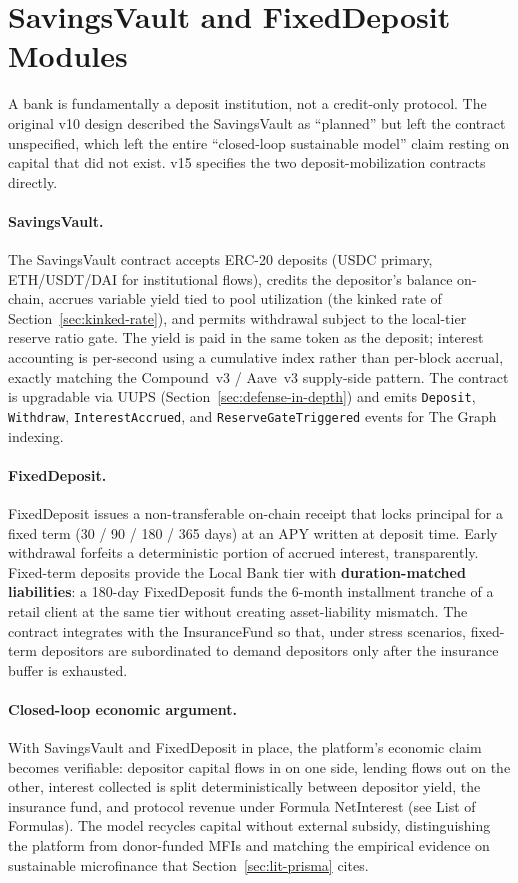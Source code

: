 \documentclass[12pt,a4paper]{report}
\begin{document}
\section{SavingsVault and FixedDeposit Modules}
\label{sec:savings-vault}

A bank is fundamentally a deposit institution, not a credit-only protocol. The original v10 design described the SavingsVault as ``planned'' but left the contract unspecified, which left the entire ``closed-loop sustainable model'' claim resting on capital that did not exist. v15 specifies the two deposit-mobilization contracts directly.

\paragraph{SavingsVault.}
The SavingsVault contract accepts ERC-20 deposits (USDC primary, ETH/USDT/DAI for institutional flows), credits the depositor's balance on-chain, accrues variable yield tied to pool utilization (the kinked rate of Section~\ref{sec:kinked-rate}), and permits withdrawal subject to the local-tier reserve ratio gate. The yield is paid in the same token as the deposit; interest accounting is per-second using a cumulative index rather than per-block accrual, exactly matching the Compound~v3 / Aave~v3 supply-side pattern. The contract is upgradable via UUPS (Section~\ref{sec:defense-in-depth}) and emits \texttt{Deposit}, \texttt{Withdraw}, \texttt{InterestAccrued}, and \texttt{ReserveGateTriggered} events for The Graph indexing.

\paragraph{FixedDeposit.}
FixedDeposit issues a non-transferable on-chain receipt that locks principal for a fixed term (30 / 90 / 180 / 365 days) at an APY written at deposit time. Early withdrawal forfeits a deterministic portion of accrued interest, transparently. Fixed-term deposits provide the Local Bank tier with \textbf{duration-matched liabilities}: a 180-day FixedDeposit funds the 6-month installment tranche of a retail client at the same tier without creating asset-liability mismatch. The contract integrates with the InsuranceFund so that, under stress scenarios, fixed-term depositors are subordinated to demand depositors only after the insurance buffer is exhausted.

\paragraph{Closed-loop economic argument.}
With SavingsVault and FixedDeposit in place, the platform's economic claim becomes verifiable: depositor capital flows in on one side, lending flows out on the other, interest collected is split deterministically between depositor yield, the insurance fund, and protocol revenue under Formula NetInterest (see List of Formulas). The model recycles capital without external subsidy, distinguishing the platform from donor-funded MFIs and matching the empirical evidence on sustainable microfinance that Section~\ref{sec:lit-prisma} cites.
\end{document}
